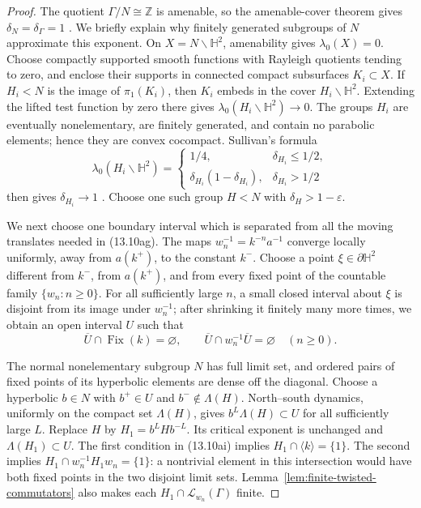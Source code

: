 \documentclass[11pt,reqno]{amsart}
\theoremstyle{definition}
\theoremstyle{remark}
\newcommand{\Z}{\mathbb Z}
\begin{document}
\begin{proof}
The quotient \(\Gamma/N\cong\Z\) is amenable, so the
amenable-cover theorem gives \(\delta_N=\delta_\Gamma=1\)
\cite{Brooks,DougallSharp}.  We briefly explain why finitely generated
subgroups of \(N\) approximate this exponent.  On
\(X=N\backslash\mathbb H^2\), amenability gives \(\lambda_0(X)=0\).
Choose compactly supported smooth functions with Rayleigh quotients tending
to zero, and enclose their supports in connected compact subsurfaces
\(K_i\subset X\).  If \(H_i<N\) is the image of \(\pi_1(K_i)\), then
\(K_i\) embeds in the cover
\(H_i\backslash\mathbb H^2\).  Extending the lifted test function by zero
there gives
\(\lambda_0(H_i\backslash\mathbb H^2)\to0\).  The groups \(H_i\) are
eventually nonelementary, are finitely generated, and contain no parabolic
elements; hence they are convex cocompact.  Sullivan's formula
\[
 \lambda_0(H_i\backslash\mathbb H^2)=
 \begin{cases}
  1/4,&\delta_{H_i}\le1/2,\\
  \delta_{H_i}(1-\delta_{H_i}),&\delta_{H_i}>1/2
 \end{cases}
\]
then gives \(\delta_{H_i}\to1\) \cite{SullivanPositivity,BorthwickSpectral}.
Choose one such group \(H<N\) with
\(\delta_H>1-\varepsilon\).

We next choose one boundary interval which is separated from all the
moving translates needed in (13.10ag).  The maps
\(w_n^{-1}=k^{-n}a^{-1}\) converge locally uniformly, away from
\(a(k^+)\), to the constant \(k^-\).  Choose a point
\(\xi\in\partial\mathbb H^2\) different from \(k^-\), from \(a(k^+)\),
and from every fixed point of the countable family \(\{w_n:n\ge0\}\).
For all sufficiently large \(n\), a small closed interval about \(\xi\)
is disjoint from its image under \(w_n^{-1}\); after shrinking it finitely
many more times, we obtain an open interval \(U\) such that
\[
 \overline U\cap\operatorname{Fix}(k)=\varnothing,
 \qquad
 \overline U\cap w_n^{-1}\overline U=\varnothing
 \quad(n\ge0).
\tag{13.10ai}
\]

The normal nonelementary subgroup \(N\) has full limit set, and ordered
pairs of fixed points of its hyperbolic elements are dense off the diagonal.
Choose a hyperbolic \(b\in N\) with \(b^+\in U\) and
\(b^-\notin\Lambda(H)\).  North--south dynamics, uniformly on the compact
set \(\Lambda(H)\), gives
\(b^L\Lambda(H)\subset U\) for all sufficiently large \(L\).  Replace
\(H\) by \(H_1=b^LHb^{-L}\).  Its critical exponent is unchanged and
\(\Lambda(H_1)\subset U\).  The first condition in (13.10ai) implies
\(H_1\cap\langle k\rangle=\{1\}\).  The second implies
\(H_1\cap w_n^{-1}H_1w_n=\{1\}\): a nontrivial element in this
intersection would have both fixed points in the two disjoint limit sets.
Lemma~\ref{lem:finite-twisted-commutators} also makes each
\(H_1\cap\mathcal L_{w_n}(\Gamma)\) finite.


\end{proof}
\end{document}
